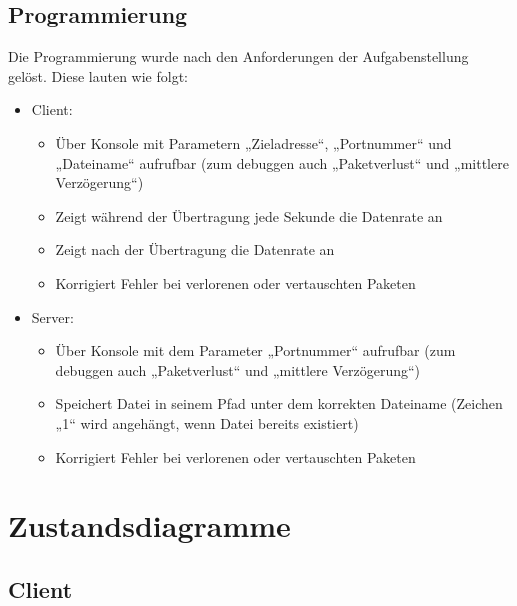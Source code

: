 \subsection{Programmierung}

Die Programmierung wurde nach den Anforderungen der Aufgabenstellung gelöst. Diese lauten wie folgt:
\begin{itemize}
\item Client:
\begin{itemize}
\item Über Konsole mit Parametern „Zieladresse“, „Portnummer“ und „Dateiname“ aufrufbar (zum debuggen auch „Paketverlust“ und „mittlere Verzögerung“)
\item Zeigt während der Übertragung jede Sekunde die Datenrate an
\item Zeigt nach der Übertragung die Datenrate an
\item Korrigiert Fehler bei verlorenen oder vertauschten Paketen
\end{itemize}
\item Server:
\begin{itemize}
\item Über Konsole mit dem Parameter „Portnummer“ aufrufbar (zum debuggen auch „Paketverlust“ und „mittlere Verzögerung“)
\item Speichert Datei in seinem Pfad unter dem korrekten Dateiname (Zeichen „1“ wird angehängt, wenn Datei bereits existiert)
\item Korrigiert Fehler bei verlorenen oder vertauschten Paketen
\end{itemize}
\end{itemize}

\section{Zustandsdiagramme}
\label{stated}
\subsection{Client}
\begin{center}
\end{center}

